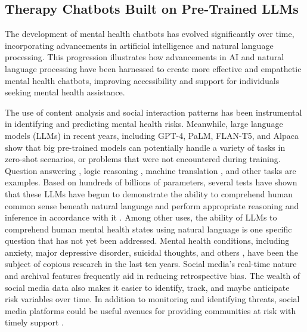 \subsection{Therapy Chatbots Built on Pre-Trained LLMs} 
The development of mental health chatbots has evolved significantly over time, incorporating advancements in artificial intelligence and natural language processing. This progression illustrates how advancements in AI and natural language processing have been harnessed to create more effective and empathetic mental health chatbots, improving accessibility and support for individuals seeking mental health assistance.

The use of content analysis and social interaction patterns has been instrumental in identifying and predicting mental health risks. Meanwhile, large language models (LLMs) in recent years, including GPT-4, PaLM, FLAN-T5, and Alpaca show that big pre-trained models can potentially handle a variety of tasks in zero-shot scenarios, or problems that were not encountered during training. Question answering \cite{omar2023chatgpt}, logic reasoning \cite{wei2022finetuned}, machine translation \cite{brants2007large}, and other tasks are examples. Based on hundreds of billions of parameters, several tests have shown that these LLMs have begun to demonstrate the ability to comprehend human common sense beneath natural language and perform appropriate reasoning and inference in accordance with it \cite{bubeck2023sparks}. Among other uses, the ability of LLMs to comprehend human mental health states using natural language is one specific question that has not yet been addressed. Mental health conditions, including anxiety, major depressive disorder, suicidal thoughts, and others \cite{coppersmith2015adhd}, have been the subject of copious research in the last ten years. Social media's real-time nature and archival features frequently aid in reducing retrospective bias. The wealth of social media data also makes it easier to identify, track, and maybe anticipate risk variables over time. In addition to monitoring and identifying threats, social media platforms could be useful avenues for providing communities at risk with timely support \cite{kruzan2022social}.

